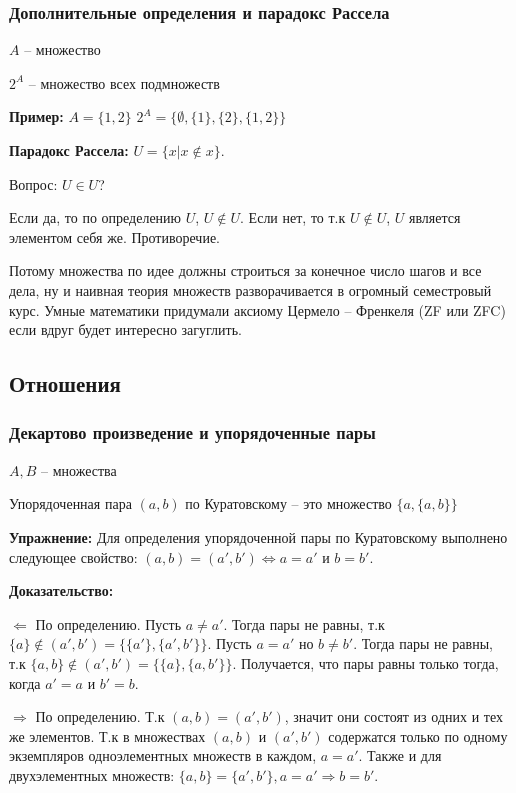 \documentclass[openany]{article}
\begin{document}
   \subsubsection{Дополнительные определения и парадокс Рассела}

   $A$ -- множество

   $2^{A}$ -- множество всех подмножеств

   \textbf{Пример:} $A = \{1, 2\}$ $2^{A} = \{\emptyset, \{1\}, \{2\}, \{1, 2\}\}$

   \textbf{Парадокс Рассела:} $U = \{x | x \notin x\}$.

   Вопрос: $U \in U$?

   Если да, то по определению $U$, $U \notin U$. Если нет, то т.к $U \notin U$, $U$ является элементом себя же. Противоречие.

   Потому множества по идее должны строиться за конечное число шагов и все дела, ну и наивная теория множеств разворачивается в огромный семестровый курс. Умные математики придумали аксиому Цермело -- Френкеля (ZF или ZFC) если вдруг будет интересно загуглить.

   \subsection{Отношения}

   \subsubsection{Декартово произведение и упорядоченные пары}

   $A, B$ -- множества

   Упорядоченная пара $(a, b)$ по Куратовскому -- это множество $\{a, \{a, b\}\}$

   \textbf{Упражнение:} Для определения упорядоченной пары по Куратовскому выполнено следующее свойство: $(a, b) = (a', b') \Leftrightarrow a = a'$ и $b = b'$.

   \textbf{Доказательство:}

   $\Leftarrow$ По определению. Пусть $a \neq a'$. Тогда пары не равны, т.к $\{a\} \notin (a', b') = \{\{a'\}, \{a', b'\}\}$. Пусть $a = a'$ но $b \neq b'$. Тогда пары не равны, т.к $\{a, b\} \notin (a', b') = \{\{a\}, \{a, b'\}\}$. Получается, что пары равны только тогда, когда $a' = a$ и $b' = b$.

   $\Rightarrow$ По определению. Т.к $(a, b) = (a', b')$, значит они состоят из одних и тех же элементов. Т.к в множествах $(a, b)$ и $(a', b')$ содержатся только по одному экземпляров одноэлементных множеств в каждом, $a = a'$. Также и для двухэлементных множеств: $\{a, b\} = \{a', b'\}, a = a' \Rightarrow b = b'$.
\end{document}
